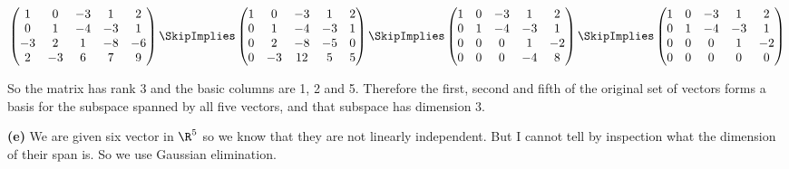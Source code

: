 \documentclass[oneside,12pt]{amsart}
\begin{document}
$
\begin{pmatrix}
1 & 0 & -3 & 1 & 2 \\
0 & 1 & -4 & -3 & 1 \\
-3 & 2 & 1 & -8 & -6 \\
2 & -3 & 6 & 7 & 9
\end{pmatrix}
\SkipImplies
\begin{pmatrix}
1 & 0 & -3 & 1 & 2 \\
0 & 1 & -4 & -3 & 1 \\
0 & 2 & -8 & -5 & 0 \\
0 & -3 & 12 & 5 & 5
\end{pmatrix}
\SkipImplies
\begin{pmatrix}
1 & 0 & -3 & 1 & 2 \\
0 & 1 & -4 & -3 & 1 \\
0 & 0 & 0 & 1 & -2 \\
0 & 0 & 0 & -4 & 8
\end{pmatrix}
\SkipImplies
\begin{pmatrix}
1 & 0 & -3 & 1 & 2 \\
0 & 1 & -4 & -3 & 1 \\
0 & 0 & 0 & 1 & -2 \\
0 & 0 & 0 & 0 & 0
\end{pmatrix}
$

So the matrix has rank 3 and the basic columns are 1, 2 and 5.
Therefore the first, second and fifth of the original set of vectors forms
a basis for the subspace spanned by all five vectors, and that subspace
has dimension 3.

\textbf{(e)} We are given six vector in $\R^5$ so we know that they are not
linearly independent. But I cannot tell by inspection what the dimension of
their span is. So we use Gaussian elimination.
\end{document}
